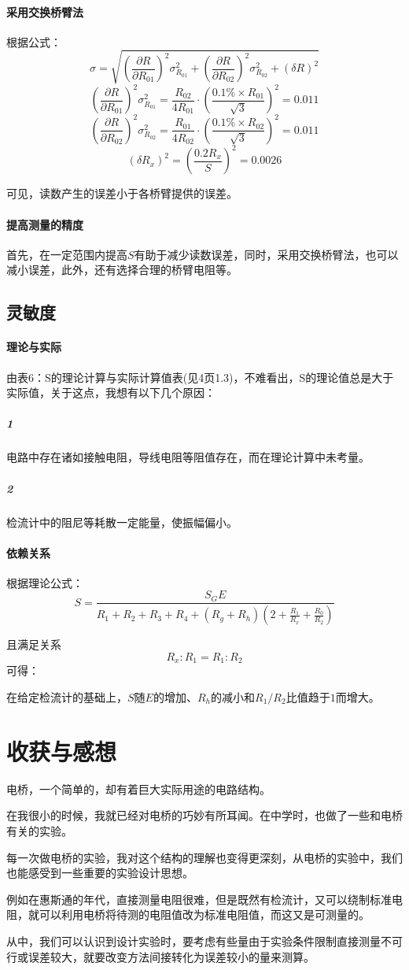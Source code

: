 \documentclass{ctexart}
\begin{document}
\paragraph{采用交换桥臂法}

根据公式：
$$\sigma=\sqrt{(\frac{\partial R}{\partial R_{01}})^2\sigma_{R_{01}}^2+(\frac{\partial R}{\partial R_{02}})^2\sigma_{R_{02}}^2+(\delta R)^2}$$
$$(\frac{\partial R}{\partial R_{01}})^2\sigma_{R_{01}}^2=\frac{R_{02}}{4R_{01}}\cdot (\frac{0.1\% \times R_{01}}{\sqrt{3}})^2=0.011$$
$$(\frac{\partial R}{\partial R_{02}})^2\sigma_{R_{02}}^2=\frac{R_{01}}{4R_{02}}\cdot (\frac{0.1\% \times R_{02}}{\sqrt{3}})^2=0.011$$
$$(\delta R_x)^2=(\frac{0.2R_x}{S})^2=0.0026$$

可见，读数产生的误差小于各桥臂提供的误差。

\paragraph{提高测量的精度}

首先，在一定范围内提高$S$有助于减少读数误差，同时，采用交换桥臂法，也可以减小误差，此外，还有选择合理的桥臂电阻等。

\subsection{灵敏度}
\paragraph{理论与实际}
由表6：S的理论计算与实际计算值表(见4页1.3)，不难看出，S的理论值总是大于实际值，关于这点，我想有以下几个原因：
\subparagraph{1}电路中存在诸如接触电阻，导线电阻等阻值存在，而在理论计算中未考量。
\subparagraph{2}检流计中的阻尼等耗散一定能量，使振幅偏小。
\paragraph{依赖关系}
根据理论公式：$$S=\frac{S_GE}{R_1+R_2+R_3+R_4+(R_g+R_h)(2+\frac{R_1}{R_x}+\frac{R_0}{R_2})}$$

且满足关系$$R_x:R_1=R_1:R_2$$可得：

在给定检流计的基础上，$S$随$E的增加$、$R_h的减小$和$R_1/R_2比值趋于1$而增大。

\section{收获与感想}
电桥，一个简单的，却有着巨大实际用途的电路结构。

在我很小的时候，我就已经对电桥的巧妙有所耳闻。在中学时，也做了一些和电桥有关的实验。

每一次做电桥的实验，我对这个结构的理解也变得更深刻，从电桥的实验中，我们也能感受到一些重要的实验设计思想。

例如在惠斯通的年代，直接测量电阻很难，但是既然有检流计，又可以绕制标准电阻，就可以利用电桥将待测的电阻值改为标准电阻值，而这又是可测量的。

从中，我们可以认识到设计实验时，要考虑有些量由于实验条件限制直接测量不可行或误差较大，就要改变方法间接转化为误差较小的量来测算。
\end{document}
